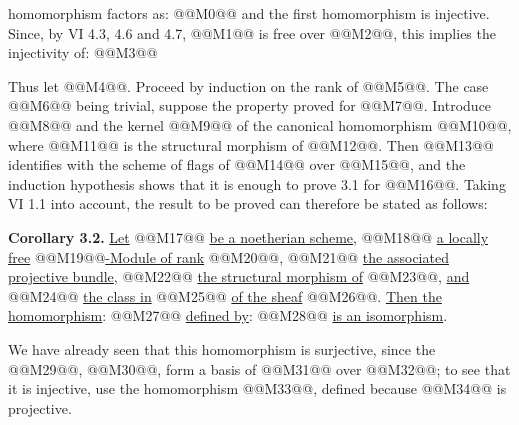
homomorphism factors as:
@@M0@@
and the first homomorphism is injective. Since, by VI 4.3, 4.6 and 4.7, @@M1@@ is free over @@M2@@, this implies the injectivity of:
@@M3@@

Thus let @@M4@@. Proceed by induction on the rank of @@M5@@. The case @@M6@@ being trivial, suppose the property proved for @@M7@@. Introduce @@M8@@ and the kernel @@M9@@ of the canonical homomorphism @@M10@@, where @@M11@@ is the structural morphism of @@M12@@. Then @@M13@@ identifies with the scheme of flags of @@M14@@ over @@M15@@, and the induction hypothesis shows that it is enough to prove 3.1 for @@M16@@. Taking VI 1.1 into account, the result to be proved can therefore be stated as follows:

\textbf{Corollary 3.2.} \uline{Let} @@M17@@ \uline{be a noetherian scheme}, @@M18@@ \uline{a locally free} @@M19@@\uline{-Module of rank} @@M20@@, @@M21@@ \uline{the associated projective bundle}, @@M22@@ \uline{the structural morphism of} @@M23@@, \uline{and} @@M24@@ \uline{the class in} @@M25@@ \uline{of the sheaf} @@M26@@. \uline{Then the homomorphism}:
@@M27@@
\uline{defined by}:
@@M28@@
\uline{is an isomorphism}.

We have already seen that this homomorphism is surjective, since the @@M29@@, @@M30@@, form a basis of @@M31@@ over @@M32@@; to see that it is injective, use the homomorphism @@M33@@, defined because @@M34@@ is projective.

